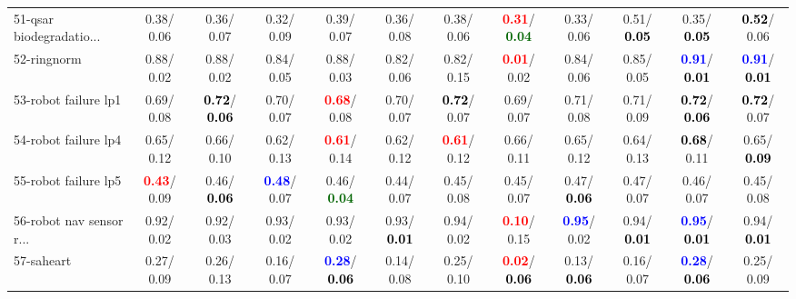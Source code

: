 \begin{table}[h]
\begin{center}
{\begin{tabular}{lc|c|c|c|c|c|c|c|c|c|c}
51-qsar biodegradatio... &   0.38/  0.06 &   0.36/  0.07 &   0.32/  0.09 &   0.39/  0.07 &   0.36/  0.08 &   0.38/  0.06 & \textcolor{red}{\textbf{  0.31}}/\textcolor{darkgreen}{\textbf{  0.04}} &   0.33/  0.06 &   0.51/\textcolor{black}{\textbf{  0.05}} &   0.35/\textcolor{black}{\textbf{  0.05}} & \textcolor{black}{\textbf{  0.52}}/  0.06 \\
52-ringnorm &   0.88/  0.02 &   0.88/  0.02 &   0.84/  0.05 &   0.88/  0.03 &   0.82/  0.06 &   0.82/  0.15 & \textcolor{red}{\textbf{  0.01}}/  0.02 &   0.84/  0.06 &   0.85/  0.05 & \textcolor{blue}{\textbf{  0.91}}/\textcolor{black}{\textbf{  0.01}} & \textcolor{blue}{\textbf{  0.91}}/\textcolor{black}{\textbf{  0.01}} \\
53-robot failure lp1 &   0.69/  0.08 & \textcolor{black}{\textbf{  0.72}}/\textcolor{black}{\textbf{  0.06}} &   0.70/  0.07 & \textcolor{red}{\textbf{  0.68}}/  0.08 &   0.70/  0.07 & \textcolor{black}{\textbf{  0.72}}/  0.07 &   0.69/  0.07 &   0.71/  0.08 &   0.71/  0.09 & \textcolor{black}{\textbf{  0.72}}/\textcolor{black}{\textbf{  0.06}} & \textcolor{black}{\textbf{  0.72}}/  0.07 \\ \hline
54-robot failure lp4 &   0.65/  0.12 &   0.66/  0.10 &   0.62/  0.13 & \textcolor{red}{\textbf{  0.61}}/  0.14 &   0.62/  0.12 & \textcolor{red}{\textbf{  0.61}}/  0.12 &   0.66/  0.11 &   0.65/  0.12 &   0.64/  0.13 & \textcolor{black}{\textbf{  0.68}}/  0.11 &   0.65/\textcolor{black}{\textbf{  0.09}} \\
55-robot failure lp5 & \textcolor{red}{\textbf{  0.43}}/  0.09 &   0.46/\textcolor{black}{\textbf{  0.06}} & \textcolor{blue}{\textbf{  0.48}}/  0.07 &   0.46/\textcolor{darkgreen}{\textbf{  0.04}} &   0.44/  0.07 &   0.45/  0.08 &   0.45/  0.07 &   0.47/\textcolor{black}{\textbf{  0.06}} &   0.47/  0.07 &   0.46/  0.07 &   0.45/  0.08 \\
56-robot nav sensor r... &   0.92/  0.02 &   0.92/  0.03 &   0.93/  0.02 &   0.93/  0.02 &   0.93/\textcolor{black}{\textbf{  0.01}} &   0.94/  0.02 & \textcolor{red}{\textbf{  0.10}}/  0.15 & \textcolor{blue}{\textbf{  0.95}}/  0.02 &   0.94/\textcolor{black}{\textbf{  0.01}} & \textcolor{blue}{\textbf{  0.95}}/\textcolor{black}{\textbf{  0.01}} &   0.94/\textcolor{black}{\textbf{  0.01}} \\
57-saheart &   0.27/  0.09 &   0.26/  0.13 &   0.16/  0.07 & \textcolor{blue}{\textbf{  0.28}}/\textcolor{black}{\textbf{  0.06}} &   0.14/  0.08 &   0.25/  0.10 & \textcolor{red}{\textbf{  0.02}}/\textcolor{black}{\textbf{  0.06}} &   0.13/\textcolor{black}{\textbf{  0.06}} &   0.16/  0.07 & \textcolor{blue}{\textbf{  0.28}}/\textcolor{black}{\textbf{  0.06}} &   0.25/  0.09 \\

\end{tabular}}
\end{center}
\end{table}
